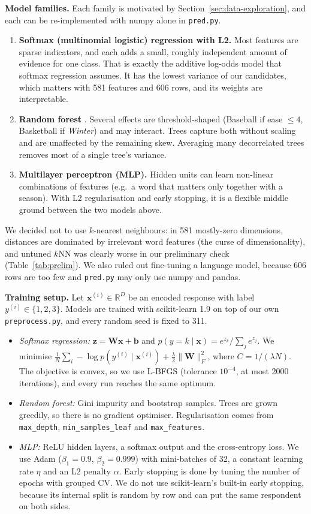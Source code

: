 \documentclass[12pt]{article}
\newcommand{\vect}[1]{\mathbf{#1}}
\begin{document}
\textbf{Model families.} Each family is motivated by Section~\ref{sec:data-exploration}, and each can be re-implemented with numpy alone in \texttt{pred.py}.
\begin{enumerate}[leftmargin=*]
\item \textbf{Softmax (multinomial logistic) regression with L2.} Most features are sparse indicators, and each adds a small, roughly independent amount of evidence for one class. That is exactly the additive log-odds model that softmax regression assumes. It has the lowest variance of our candidates, which matters with 581 features and 606 rows, and its weights are interpretable.
\item \textbf{Random forest} \cite{breiman2001rf}. Several effects are threshold-shaped (Baseball if ease $\le 4$, Basketball if \emph{Winter}) and may interact. Trees capture both without scaling and are unaffected by the remaining skew. Averaging many decorrelated trees removes most of a single tree's variance.
\item \textbf{Multilayer perceptron (MLP).} Hidden units can learn non-linear combinations of features (e.g.\ a word that matters only together with a season). With L2 regularisation and early stopping, it is a flexible middle ground between the two models above.
\end{enumerate}
We decided not to use $k$-nearest neighbours: in 581 mostly-zero dimensions, distances are dominated by irrelevant word features (the curse of dimensionality), and untuned $k$NN was clearly worse in our preliminary check (Table~\ref{tab:prelim}). We also ruled out fine-tuning a language model, because 606 rows are too few and \texttt{pred.py} may only use numpy and pandas.

\textbf{Training setup.} Let $\vect{x}^{(i)}\in\mathbb{R}^{D}$ be an encoded response with label $y^{(i)}\in\{1,2,3\}$. Models are trained with scikit-learn 1.9 \cite{pedregosa2011sklearn} on top of our own \texttt{preprocess.py}, and every random seed is fixed to 311.
\begin{itemize}[leftmargin=*]
\item \emph{Softmax regression:} $\vect{z}=\vect{W}\vect{x}+\vect{b}$ and $p(y=k\mid\vect{x})=e^{z_k}/\sum_j e^{z_j}$. We minimise $\frac1N\sum_i -\log p(y^{(i)}\mid\vect{x}^{(i)})+\frac{\lambda}{2}\lVert\vect{W}\rVert_F^2$, where $C=1/(\lambda N)$. The objective is convex, so we use L-BFGS (tolerance $10^{-4}$, at most 2000 iterations), and every run reaches the same optimum.
\item \emph{Random forest:} Gini impurity and bootstrap samples. Trees are grown greedily, so there is no gradient optimiser. Regularisation comes from \texttt{max\_depth}, \texttt{min\_samples\_leaf} and \texttt{max\_features}.
\item \emph{MLP:} ReLU hidden layers, a softmax output and the cross-entropy loss. We use Adam ($\beta_1=0.9$, $\beta_2=0.999$) with mini-batches of 32, a constant learning rate $\eta$ and an L2 penalty $\alpha$. Early stopping is done by tuning the number of epochs with grouped CV. We do not use scikit-learn's built-in early stopping, because its internal split is random by row and can put the same respondent on both sides.
\end{itemize}
\end{document}
